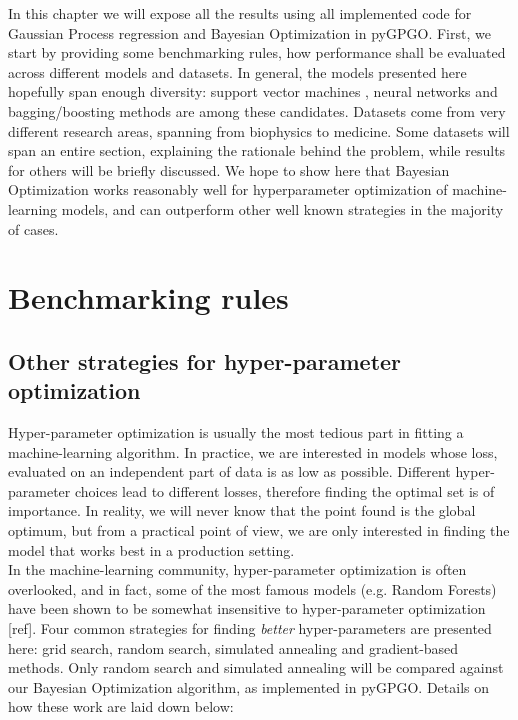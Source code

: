 \documentclass[10pt,a4paper,twoside]{book}
\begin{document}
In this chapter we will expose all the results using all implemented code for Gaussian Process regression and Bayesian Optimization in pyGPGO. First, we start by providing some benchmarking rules, how performance shall be evaluated across different models and datasets. In general, the models presented here hopefully span enough diversity: support vector machines , neural networks and bagging/boosting methods are among these candidates. Datasets come from very different research areas, spanning from biophysics to medicine. Some datasets will span an entire section, explaining the rationale behind the problem, while results for others will be briefly discussed. We hope to show here that Bayesian Optimization works reasonably well for hyperparameter optimization of machine-learning models, and can outperform other well known strategies in the majority of cases.


\section{Benchmarking rules}
\subsection{Other strategies for hyper-parameter optimization}

Hyper-parameter optimization is usually the most tedious part in fitting a machine-learning algorithm. In practice, we are interested in models whose loss, evaluated on an independent part of data is as low as possible. Different hyper-parameter choices lead to different losses, therefore finding the optimal set is of importance. In reality, we will never know that the point found is the global optimum, but from a practical point of view, we are only interested in finding the model that works best in a production setting.\\

In the machine-learning community, hyper-parameter optimization is often overlooked, and in fact, some of the most famous models (e.g. Random Forests) have been shown to be somewhat insensitive to hyper-parameter optimization [ref]. Four common strategies for finding \textit{better} hyper-parameters are presented here: grid search, random search, simulated annealing and gradient-based methods. Only random search and simulated annealing will be compared against our Bayesian Optimization algorithm, as implemented in pyGPGO. Details on how these work are laid down below:
\end{document}

